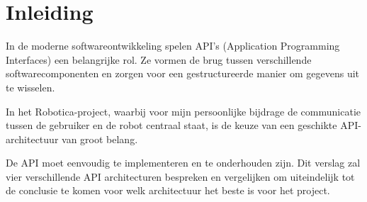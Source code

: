 
\section{Inleiding}
\label{sec:inleiding}

In de moderne softwareontwikkeling spelen API's (Application Programming Interfaces)
een belangrijke rol. Ze vormen de brug tussen verschillende softwarecomponenten
en zorgen voor een gestructureerde manier om gegevens uit te wisselen.\cite{masse2011}

In het Robotica-project, waarbij voor mijn persoonlijke bijdrage de communicatie
tussen de gebruiker en de robot centraal staat,
is de keuze van een geschikte API-architectuur van groot belang.

De API moet eenvoudig te implementeren en te onderhouden zijn.
Dit verslag zal vier verschillende API architecturen bespreken en vergelijken
om uiteindelijk tot de conclusie te komen voor welk architectuur het beste is
voor het project.
